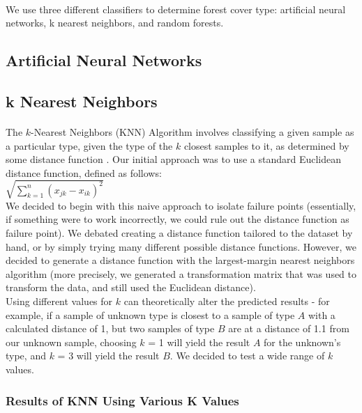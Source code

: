 \documentclass[11pt]{article}
\begin{document}
\paragraph{}
We use three different classifiers to determine forest cover type: artificial neural networks, k nearest neighbors, and random forests.
\subsection{Artificial Neural Networks}
\subsection{k Nearest Neighbors}
\paragraph{}
The $k$-Nearest Neighbors (KNN) Algorithm involves classifying a given sample as a particular type, given the type of the $k$ closest samples to it, as determined by some distance function \cite{matlabpage}. Our initial approach was to use a standard Euclidean distance function, defined as follows:
\\
$\sqrt{\sum\limits_{k = 1}^n (x_{jk} - x_{ik})^2}$
\\
We decided to begin with this naive approach to isolate failure points (essentially, if something were to work incorrectly, we could rule out the distance function as failure point).
We debated creating a distance function tailored to the dataset by hand, or by simply trying many different possible distance functions. However, we decided to generate a distance function with the largest-margin nearest neighbors algorithm (more precisely, we generated a transformation matrix that was used to transform the data, and still used the Euclidean distance).
\\
Using different values for $k$ can theoretically alter the predicted results - for example, if a sample of unknown type is closest to a sample of type $A$ with a calculated distance of 1, but two samples of type $B$ are at a distance of 1.1 from our unknown sample, choosing $k$ = 1 will yield the result $A$ for the unknown's type, and $k$ = 3 will yield the result $B$. We decided to test a wide range of $k$ values.
\subsubsection{Results of KNN Using Various K Values}
\end{document}
